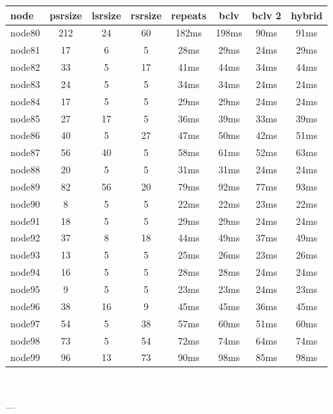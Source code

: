 \begin{tabular}{|l|c|c|c|c|c|c|c|}
\hline node & psrsize & lsrsize & rsrsize   & repeats & bclv & bclv 2 & hybrid\\
    \hline node80 & 212 & 24 & 60 & 182ms & 198ms & 90ms & 91ms\\
    \hline node81 & 17 & 6 & 5 & 28ms & 29ms & 24ms & 29ms\\
    \hline node82 & 33 & 5 & 17 & 41ms & 44ms & 34ms & 44ms\\
    \hline node83 & 24 & 5 & 5 & 34ms & 34ms & 24ms & 24ms\\
    \hline node84 & 17 & 5 & 5 & 29ms & 29ms & 24ms & 24ms\\
    \hline node85 & 27 & 17 & 5 & 36ms & 39ms & 33ms & 39ms\\
    \hline node86 & 40 & 5 & 27 & 47ms & 50ms & 42ms & 51ms\\
    \hline node87 & 56 & 40 & 5 & 58ms & 61ms & 52ms & 63ms\\
    \hline node88 & 20 & 5 & 5 & 31ms & 31ms & 24ms & 24ms\\
    \hline node89 & 82 & 56 & 20 & 79ms & 92ms & 77ms & 93ms\\
    \hline node90 & 8 & 5 & 5 & 22ms & 22ms & 23ms & 22ms\\
    \hline node91 & 18 & 5 & 5 & 29ms & 29ms & 24ms & 24ms\\
    \hline node92 & 37 & 8 & 18 & 44ms & 49ms & 37ms & 49ms\\
    \hline node93 & 13 & 5 & 5 & 25ms & 26ms & 23ms & 26ms\\
    \hline node94 & 16 & 5 & 5 & 28ms & 28ms & 24ms & 24ms\\
    \hline node95 & 9 & 5 & 5 & 23ms & 23ms & 24ms & 23ms\\
    \hline node96 & 38 & 16 & 9 & 45ms & 45ms & 36ms & 45ms\\
    \hline node97 & 54 & 5 & 38 & 57ms & 60ms & 51ms & 60ms\\
    \hline node98 & 73 & 5 & 54 & 72ms & 74ms & 64ms & 74ms\\
    \hline node99 & 96 & 13 & 73 & 90ms & 98ms & 85ms & 98ms\\

\hline
\end{tabular} \

---


